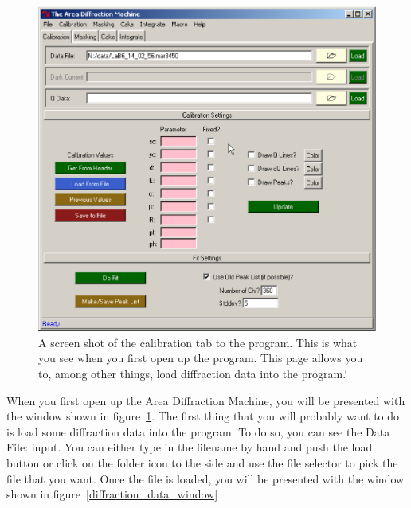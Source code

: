 
\begin{figure}
    \centering
    \includegraphics[scale=.75]{figures/calibration_page.eps}
    \caption{A screen shot of the calibration tab to the program.
    This is what you see when you first open up the program. 
    This page allows you to, among other things, load diffraction
    data into the program.`} 
    \label{calibration_page}
\end{figure}



When you first open up the Area Diffraction Machine, you
will be presented with the window shown in 
figure~\ref{calibration_page}. The first thing that you
will probably want to do is load some diffraction data into
the program. To do so, you can see the Data File: input.
You can either type in the filename by hand and push the
load button or click on the folder icon to the side and
use the file selector to pick the file that you want.
Once the file is loaded, you will be presented with
the window shown in figure~\ref{diffraction_data_window}

